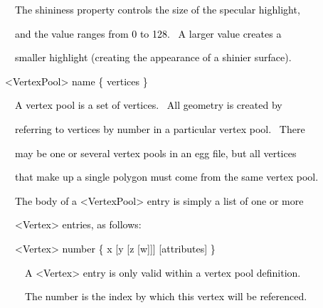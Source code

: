 \documentclass[a4paper]{article}
\newcommand\textstyleOOoComputerKeyWord[1]{\textrm{\textcolor[rgb]{0.0,0.0,0.5019608}{#1}}}
\begin{document}
\bigskip

{\color{black}
\textstyleOOoComputerKeyWord{\textcolor{black}{\ \ The shininess property controls the size of the specular
highlight,}}}

{\color{black}
\textstyleOOoComputerKeyWord{\textcolor{black}{\ \ and the value ranges from 0 to 128. \ A larger value creates a}}}

{\color{black}
\textstyleOOoComputerKeyWord{\textcolor{black}{\ \ smaller highlight (creating the appearance of a shinier surface).}}}


\bigskip


\bigskip

{\color{black}
\textstyleOOoComputerKeyWord{\textcolor{black}{{\textless}VertexPool{\textgreater} name \{ vertices \}}}}


\bigskip

{\color{black}
\textstyleOOoComputerKeyWord{\textcolor{black}{\ \ A vertex pool is a set of vertices. \ All geometry is created by}}}

{\color{black}
\textstyleOOoComputerKeyWord{\textcolor{black}{\ \ referring to vertices by number in a particular vertex pool.
\ There}}}

{\color{black}
\textstyleOOoComputerKeyWord{\textcolor{black}{\ \ may be one or several vertex pools in an egg file, but all
vertices}}}

{\color{black}
\textstyleOOoComputerKeyWord{\textcolor{black}{\ \ that make up a single polygon must come from the same vertex pool.}}}

{\color{black}
\textstyleOOoComputerKeyWord{\textcolor{black}{\ \ The body of a {\textless}VertexPool{\textgreater} entry is simply a
list of one or more}}}

{\color{black}
\textstyleOOoComputerKeyWord{\textcolor{black}{\ \ {\textless}Vertex{\textgreater} entries, as follows:}}}


\bigskip


\bigskip

{\color{black}
\textstyleOOoComputerKeyWord{\textcolor{black}{\ \ {\textless}Vertex{\textgreater} number \{ x [y [z [w]]] [attributes]
\}}}}


\bigskip

{\color{black}
\textstyleOOoComputerKeyWord{\textcolor{black}{\ \ \ \ A {\textless}Vertex{\textgreater} entry is only valid within a
vertex pool definition.}}}

{\color{black}
\textstyleOOoComputerKeyWord{\textcolor{black}{\ \ \ \ The number is the index by which this vertex will be
referenced.}}}
\end{document}
